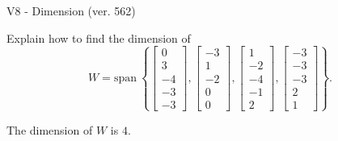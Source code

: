 \begin{exercise}
  \begin{exerciseTitle}V8 - Dimension (ver. 562)\end{exerciseTitle}
  \begin{exerciseStatement}
    Explain how to find the dimension of 
\[W=\mathrm{span}\ \left\{\left[\begin{array}{r}
0 \\
3 \\
-4 \\
-3 \\
-3
\end{array}\right] , \left[\begin{array}{r}
-3 \\
1 \\
-2 \\
0 \\
0
\end{array}\right] , \left[\begin{array}{r}
1 \\
-2 \\
-4 \\
-1 \\
2
\end{array}\right] , \left[\begin{array}{r}
-3 \\
-3 \\
-3 \\
2 \\
1
\end{array}\right]\right\}.\]



  \end{exerciseStatement}
  \begin{exerciseAnswer}
   The dimension of \(W\) is  \(4\).
  


  \end{exerciseAnswer}
\end{exercise}